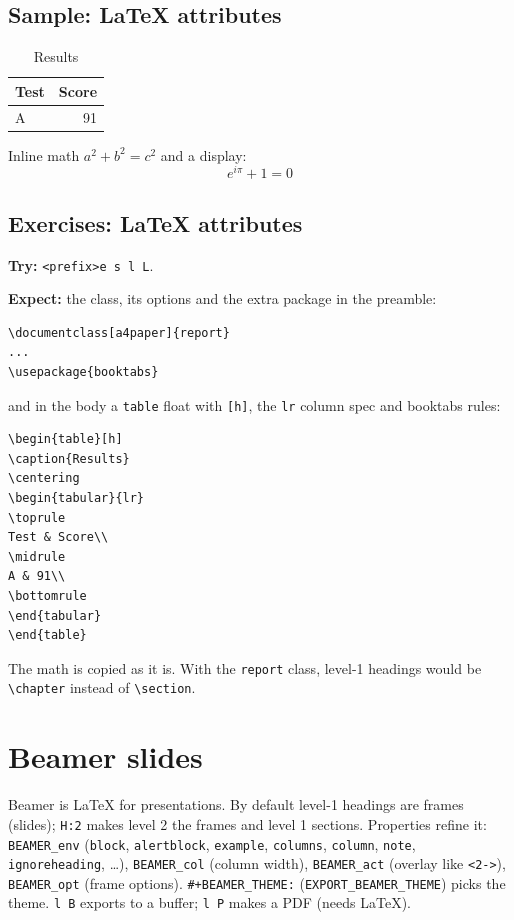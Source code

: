 \subsection{Sample: \LaTeX{} attributes}
\label{sec:org76b3a65}
\begin{table}[h]
\caption{Results}
\centering
\begin{tabular}{lr}
\toprule
Test & Score\\
\midrule
A & 91\\
\bottomrule
\end{tabular}
\end{table}

Inline math \(a^2 + b^2 = c^2\) and a display:
\begin{equation}
e^{i\pi} + 1 = 0
\end{equation}
\subsection{Exercises: \LaTeX{} attributes}
\label{sec:org1b1dca1}
\textbf{Try:} \texttt{<prefix>e s l L}.

\textbf{Expect:} the class, its options and the extra package in the preamble:

\begin{verbatim}
\documentclass[a4paper]{report}
...
\usepackage{booktabs}
\end{verbatim}

and in the body a \texttt{table} float with \texttt{[h]}, the \texttt{lr} column spec and
booktabs rules:

\begin{verbatim}
\begin{table}[h]
\caption{Results}
\centering
\begin{tabular}{lr}
\toprule
Test & Score\\
\midrule
A & 91\\
\bottomrule
\end{tabular}
\end{table}
\end{verbatim}

The math is copied as it is. With the \texttt{report} class, level-1 headings
would be \texttt{\textbackslash{}chapter} instead of \texttt{\textbackslash{}section}.
\section{Beamer slides}
\label{sec:org2ee033a}
Beamer is \LaTeX{} for presentations. By default level-1 headings are frames
(slides); \texttt{H:2} makes level 2 the frames and level 1 sections. Properties
refine it: \texttt{BEAMER\_env} (\texttt{block}, \texttt{alertblock}, \texttt{example}, \texttt{columns},
\texttt{column}, \texttt{note}, \texttt{ignoreheading}, \ldots{}), \texttt{BEAMER\_col} (column width),
\texttt{BEAMER\_act} (overlay like \texttt{<2->}), \texttt{BEAMER\_opt} (frame options).
\texttt{\#+BEAMER\_THEME:} (\texttt{EXPORT\_BEAMER\_THEME}) picks the theme. \texttt{l B} exports
to a buffer; \texttt{l P} makes a PDF (needs \LaTeX{}).
